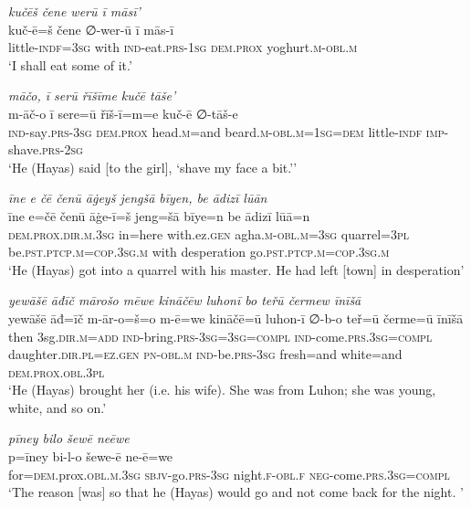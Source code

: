 \ea \label{ŽH.42}
\textit{kučēš čene werū ī māsī’} \\ 
\gll kuč-ē=š čene ∅-wer-ū ī mās-ī \\ 
 little\textsc{-indf}\textsc{=3sg} with \textsc{ind-}eat\textsc{.prs}\textsc{-1sg} \textsc{dem.prox} yoghurt\textsc{.m}\textsc{-obl}\textsc{.m} \\ 
\glt `I shall eat some of it.'
\z 
 
\ea \label{ŽH.53}
\textit{māčo, ī serū řīšīme kučē tāše’} \\ 
\gll m-āč-o ī sere=ū řīš-ī=m=e kuč-ē ∅-tāš-e \\ 
 \textsc{ind-}say\textsc{.prs}\textsc{-3sg} \textsc{dem.prox} head\textsc{.m}=and beard\textsc{.m}\textsc{-obl}\textsc{.m}\textsc{=1sg}\textsc{=dem} little\textsc{-indf} \textsc{imp-}shave\textsc{.prs}-\textsc{2sg} \\ 
\glt `He (Hayas) said [to the girl], ‘shave my face a bit.’'
\z 
 
\ea \label{ŽH.62}
\textit{īne e čē čenū āġeyš jengšā bīyen, be ādizī lūān} \\ 
\gll īne e=čē čenū āġe-ī=š jeng=šā bīye=n be ādizī lūā=n \\ 
 \textsc{dem.prox}\textsc{.dir}\textsc{.m}\textsc{.3sg} in=here with.ez\textsc{.gen} agha\textsc{.m}\textsc{-obl}\textsc{.m}\textsc{=3sg} quarrel\textsc{=3pl} be\textsc{.pst}\textsc{.ptcp}\textsc{.m}\textsc{=cop}\textsc{.3sg}\textsc{.m} with desperation go\textsc{.pst}\textsc{.ptcp}\textsc{.m}\textsc{=cop}\textsc{.3sg}\textsc{.m} \\ 
\glt `He (Hayas) got into a quarrel with his master. He had left [town] in desperation'
\z 
 
\ea \label{ŽH.65}
\textit{yewāšē āđīč mārošo mēwe kināčēw luhonī bo teřū čermew īnīšā} \\ 
\gll yewāšē āđ=īč m-ār-o=š=o m-ē=we kināčē=ū luhon-ī ∅-b-o teř=ū čerme=ū īnīšā \\ 
 then 3sg\textsc{.dir}\textsc{.m}\textsc{=add} \textsc{ind-}bring\textsc{.prs}\textsc{-3sg}\textsc{=3sg}\textsc{=compl} \textsc{ind-}come\textsc{.prs}\textsc{.3sg}\textsc{=compl} daughter\textsc{.dir}\textsc{.pl}\textsc{=ez}\textsc{.gen} \textsc{pn}\textsc{-obl}\textsc{.m} \textsc{ind-}be\textsc{.prs}\textsc{-3sg} fresh=and white=and \textsc{dem.prox}\textsc{.obl}\textsc{.3pl} \\ 
\glt `He (Hayas) brought her (i.e. his wife). She was from Luhon; she was young, white, and so on.'
\z 
 
\ea \label{ŽH.70}
\textit{pīney bilo šewē neēwe} \\ 
\gll p=īney bi-l-o šewe-ē ne-ē=we \\ 
 for\textsc{=dem}.prox\textsc{.obl}\textsc{.m}\textsc{.3sg} \textsc{sbjv-}go\textsc{.prs}\textsc{-3sg} night\textsc{\textsc{.f}}\textsc{-obl}\textsc{\textsc{.f}} \textsc{neg-}come\textsc{.prs}\textsc{.3sg}\textsc{=compl} \\ 
\glt `The reason [was] so that he (Hayas) would go and not come back for the night. '
\z 
 
